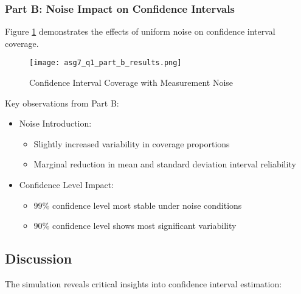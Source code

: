\documentclass[12pt]{article}
\begin{document}
\subsubsection{Part B: Noise Impact on Confidence Intervals}
Figure \ref{fig:asg7_q1_part_b_results} demonstrates the effects of uniform noise on confidence interval coverage.

\begin{figure}[H]
    \centering
    \texttt{[image: asg7\_q1\_part\_b\_results.png]}
    \caption{Confidence Interval Coverage with Measurement Noise}
    \label{fig:asg7_q1_part_b_results}
\end{figure}

Key observations from Part B:
\begin{itemize}
    \item Noise Introduction:
    \begin{itemize}
        \item Slightly increased variability in coverage proportions
        \item Marginal reduction in mean and standard deviation interval reliability
    \end{itemize}
    
    \item Confidence Level Impact:
    \begin{itemize}
        \item 99\% confidence level most stable under noise conditions
        \item 90\% confidence level shows most significant variability
    \end{itemize}
\end{itemize}

\subsection{Discussion}
The simulation reveals critical insights into confidence interval estimation:
\end{document}
